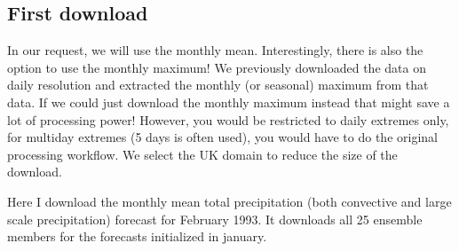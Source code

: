 \documentclass[letterpaper,10pt,english]{sphinxmanual}
\begin{document}
\subsection{First download}
\label{\detokenize{Notebooks/1.Download/1.Retrieve:First-download}}
In our request, we will use the monthly mean. Interestingly, there is also the option to use the monthly maximum! We previously downloaded the data on daily resolution and extracted the monthly (or seasonal) maximum from that data. If we could just download the monthly maximum instead that might save a lot of processing power! However, you would be restricted to daily extremes only, for multi\sphinxhyphen{}day extremes (5 days is often used), you would have to do the original processing workflow. We select
the UK domain to reduce the size of the download.

Here I download the monthly mean total precipitation (both convective and large scale precipitation) forecast for February 1993. It downloads all 25 ensemble members for the forecasts initialized in january.
\end{document}
